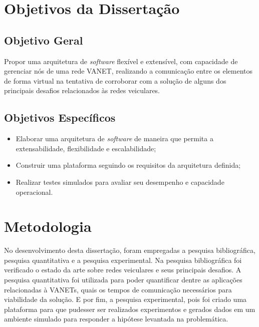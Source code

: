 \documentclass[
	12pt,				%
	oneside,			%
	a4paper,			%
	english,			%
	brazil				%
	]{abntex2ppgsi}
\begin{document}

\section{Objetivos da Dissertação}

\subsection{Objetivo Geral}
Propor uma arquitetura de \textit{software} flexível e extensível, com capacidade de gerenciar nós de uma rede VANET, realizando a comunicação entre os elementos de forma virtual na tentativa de corroborar com a solução de alguns dos principais desafios relacionados às redes veiculares.


\subsection{Objetivos Específicos}
\begin{itemize}
	\item{Elaborar uma arquitetura de \textit{software} de maneira que permita a extensabilidade, flexibilidade e escalabilidade;}	
	\item{Construir uma plataforma seguindo os requisitos da arquitetura definida;}	
	\item{Realizar testes simulados para avaliar seu desempenho e capacidade operacional.}	
\end{itemize} 

\section{Metodologia}

No desenvolvimento desta dissertação, foram empregadas a pesquisa bibliográfica, pesquisa quantitativa e a pesquisa experimental. Na pesquisa bibliográfica foi verificado o estado da arte sobre redes veiculares e seus principais desafios. A pesquisa quantitativa foi utilizada para poder quantificar dentre as aplicações relacionadas à VANETs, quais os tempos de comunicação necessários para viabilidade da solução. E por fim, a pesquisa experimental, pois foi criado uma plataforma para que pudesser ser realizados experimentos e gerados dados em um ambiente simulado para responder a hipótese levantada na problemática.
\end{document}
